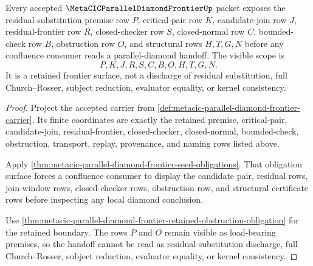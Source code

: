 \begin{theorem}
\label{thm:metacic-parallel-diamond-frontier-obligation-scope}
Every accepted $\MetaCICParallelDiamondFrontierUp$ packet exposes the residual-substitution premise row $P$, critical-pair row $K$, candidate-join row $J$, residual-frontier row $R$, closed-checker row $S$, closed-normal row $C$, bounded-check row $B$, obstruction row $O$, and structural rows $H,T,G,N$ before any confluence consumer reads a parallel-diamond handoff. The visible scope is
$$
P,K,J,R,S,C,B,O,H,T,G,N .
$$
It is a retained frontier surface, not a discharge of residual substitution, full Church--Rosser, subject reduction, evaluator equality, or kernel consistency.
\end{theorem}
\begin{proof}
Project the accepted carrier from \autoref{def:metacic-parallel-diamond-frontier-carrier}. Its finite coordinates are exactly the retained premise, critical-pair, candidate-join, residual-frontier, closed-checker, closed-normal, bounded-check, obstruction, transport, replay, provenance, and naming rows listed above.

Apply \autoref{thm:metacic-parallel-diamond-frontier-seed-obligations}. That obligation surface forces a confluence consumer to display the candidate pair, residual rows, join-window rows, closed-checker rows, obstruction row, and structural certificate rows before inspecting any local diamond conclusion.

Use \autoref{thm:metacic-parallel-diamond-frontier-retained-obstruction-obligation} for the retained boundary. The rows $P$ and $O$ remain visible as load-bearing premises, so the handoff cannot be read as residual-substitution discharge, full Church--Rosser, subject reduction, evaluator equality, or kernel consistency.
\end{proof}

